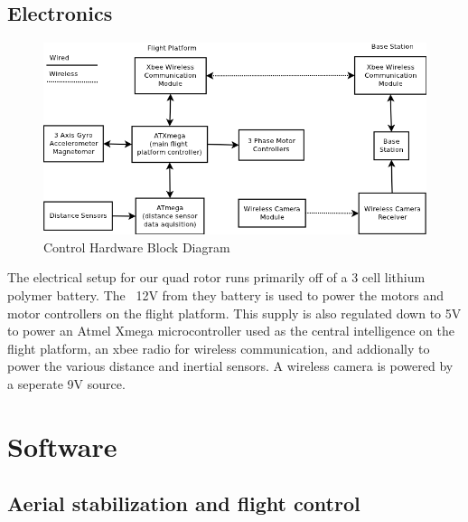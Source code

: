 \documentclass[12pt,letterpaper]{article}
\begin{document}
\subsection*{Electronics}

\begin{figure}[h!]
\caption{Control Hardware Block Diagram}
\includegraphics[width=6in]{controlhardware.png}
\end{figure}

The electrical setup for our quad rotor runs primarily off of a 3 cell
lithium polymer battery. The ~12V from they battery is used to power the motors
and motor controllers on the flight platform. This supply is also regulated down
to 5V to power an Atmel Xmega microcontroller used as the central intelligence
on the flight platform, an xbee radio for wireless communication, and
addionally to power the various distance and inertial sensors. A wireless camera
is powered by a seperate 9V source.


\section*{Software}

\subsection*{Aerial stabilization and flight control}

\end{document}
